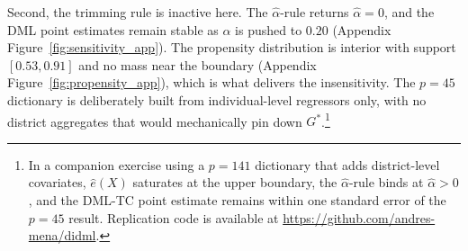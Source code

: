 Second, the trimming rule is inactive here. The $\hat\alpha$-rule returns $\hat\alpha = 0$, and the DML point estimates remain stable as $\alpha$ is pushed to $0.20$ (Appendix Figure~\ref{fig:sensitivity_app}). The propensity distribution is interior with support $[0.53, 0.91]$ and no mass near the boundary (Appendix Figure~\ref{fig:propensity_app}), which is what delivers the insensitivity. The $p = 45$ dictionary is deliberately built from individual-level regressors only, with no district aggregates that would mechanically pin down $G^*$.\footnote{In a companion exercise using a $p = 141$ dictionary that adds district-level covariates, $\hat e(X)$ saturates at the upper boundary, the $\hat\alpha$-rule binds at $\hat\alpha > 0$, and the DML-TC point estimate remains within one standard error of the $p = 45$ result. Replication code is available at \url{https://github.com/andres-mena/didml}.}
